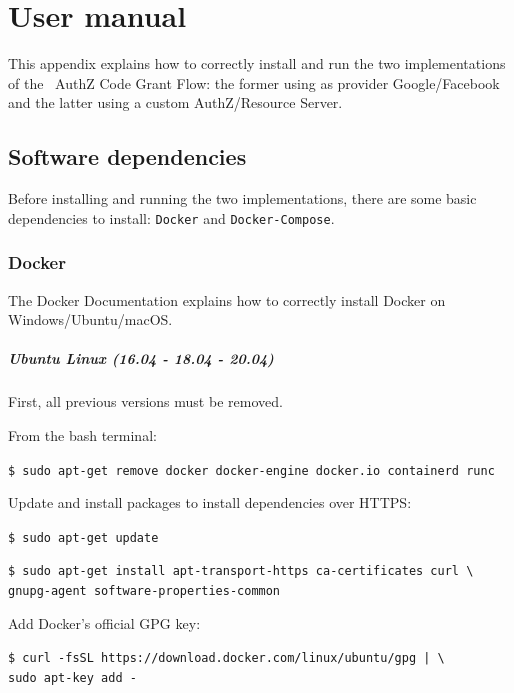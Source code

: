 
\appendix
\chapter{User manual}
This appendix explains how to correctly install and run the two implementations of the \oauth\ AuthZ Code Grant Flow: the former using as provider Google/Facebook and the latter using a custom AuthZ/Resource Server.

\minitoc

\section{Software dependencies}
\label{appa}
Before installing and running the two implementations, there are some basic dependencies to install: \texttt{Docker} and \texttt{Docker-Compose}.

\subsection{Docker}
\label{ublin}
The Docker Documentation \cite{docker} explains how to correctly install Docker on Windows/Ubuntu/macOS.

\paragraph{Ubuntu Linux (16.04 - 18.04 - 20.04)} First, all previous versions must be removed. 

\noindent From the bash terminal:
  
\texttt{\$ sudo apt-get remove docker docker-engine docker.io containerd runc}

\noindent Update and install packages to install dependencies over HTTPS:

\texttt{\$ sudo apt-get update}

\texttt{\$ sudo apt-get install apt-transport-https ca-certificates curl \textbackslash} \\
\indent \hspace{0.8cm} \texttt{gnupg-agent software-properties-common}

\noindent Add Docker’s official GPG key:

  \texttt{\$ curl -fsSL https://download.docker.com/linux/ubuntu/gpg | \textbackslash} \\
  \indent \hspace{0.8cm} \texttt{sudo apt-key add -}

